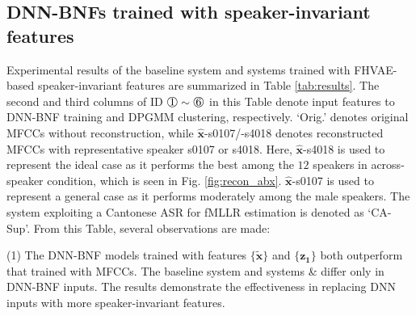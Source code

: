 \documentclass[a4paper]{article}
\def\X#1{%
        \raisebox{.9pt}{\textcircled{\raisebox{-.9pt}{#1}}}%
}
\begin{document}
\subsection{DNN-BNFs trained with speaker-invariant features}
Experimental results of the baseline system and systems trained with FHVAE-based speaker-invariant features  are summarized in Table \ref{tab:results}.
The second and third columns of ID $\X1 \sim \X6$ in this Table denote input features to DNN-BNF training and DPGMM clustering, respectively. 
`Orig.' denotes original MFCCs without reconstruction, while $\bm{\hat{x}}$-s0107/-s4018 denotes reconstructed MFCCs with representative speaker s0107 or s4018.
Here, $\bm{\hat{x}}$-s4018 is used to  represent the ideal case as it performs the best among the $12$ speakers in across-speaker condition, which is seen in Fig. \ref{fig:recon_abx}.
$\bm{\hat{x}}$-s0107 is used to represent a general case as it performs moderately
among  the male speakers. 
The system exploiting a  Cantonese ASR for fMLLR estimation \cite{Feng2018exploiting} is denoted as `CA-Sup'. From this Table, several observations are made:

(1) The DNN-BNF models trained with  features $\{\bm{\tilde{x}}\}$ and $\{\bm{z_1}\}$ both outperform that trained with MFCCs. The baseline system and  systems \X1 \& \X2 differ only in DNN-BNF inputs. The results demonstrate the effectiveness in replacing DNN inputs with more speaker-invariant features.
\end{document}
